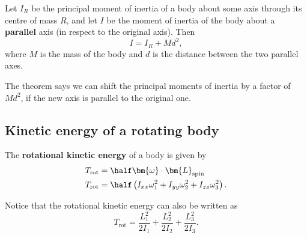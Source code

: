 \documentclass[12pt, a4paper]{article}
\begin{document}
\begin{mdthm}
    Let \(I_{R}\) be the principal moment of inertia of a body about some axis through its centre of mass \(R\), and let \(I\) be the moment of inertia of the body about a \textbf{parallel} axis (in respect to the original axis). Then 
    \[I=I_R +Md^2,\]
    where \(M\) is the mass of the body and \(d\) is the distance between the two parallel axes.
\end{mdthm}

\begin{mdnote}
    The theorem says we can shift the principal moments of inertia by a factor of \(Md^2\), if the new axis is parallel to the original one.
\end{mdnote}

\subsection{Kinetic energy of a rotating body}

\begin{mdthm}
    The \textbf{rotational kinetic energy} of a body is given by 
    \[\begin{aligned}
        T_{\text{rot}} &= \half \bm{\omega} \cdot \bm{L}_{\text{spin}} \\
        T_{\text{rot}} &= \half \left( I_{xx}\omega_1^2 +I_{yy}\omega_2^2+I_{zz}\omega_3^2 \right).
    \end{aligned}\]
\end{mdthm}

\begin{mdremark}
    Notice that the rotational kinetic energy can also be written as 
    \[T_{\text{rot}} = \frac{L_1^2}{2I_1} +\frac{L_2^2}{2I_2}+\frac{L_3^2}{2I_3}.\]
\end{mdremark}
\end{document}
